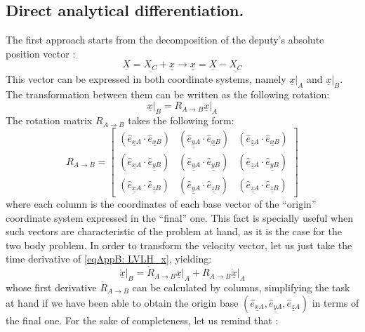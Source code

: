 	\subsection{Direct analytical differentiation.} \label{sec:	LVLH_theory}
	\indent The first approach starts from the decomposition of the deputy's absolute position vector \cite{LVLH}:
	\[
	\underline{X} = \underline{X_C} + \underline{x} \rightarrow \underline{x} = \underline{X} - \underline{X_C}
	\]
	\indent This vector can be expressed in both coordinate systems, namely $\underline{x}\rvert_A$ and $\underline{x}\rvert_B$. The transformation between them can be written as the following rotation:
	\begin{equation}
	\underline{x}\rvert_{B} = R_{A \to B} \underline{x}\rvert_{A}
	\label{eqAppB: 	LVLH_x}
	\end{equation}
	\indent The rotation matrix $R_{A \to B}$ takes the following form:
	\[
	R_{A \to B} = 
	\left[ \begin{array}{ccc}
	\left(\underline{\hat{e}_{xA}} \cdot \underline{\hat{e}_{xB}}\right) & \left(\underline{\hat{e}_{yA}} \cdot \underline{\hat{e}_{xB}}\right) & \left(\underline{\hat{e}_{zA}} \cdot \underline{\hat{e}_{xB}}\right) \\
	\left(\underline{\hat{e}_{xA}} \cdot \underline{\hat{e}_{yB}}\right) & \left(\underline{\hat{e}_{yA}} \cdot \underline{\hat{e}_{yB}}\right) & \left(\underline{\hat{e}_{zA}} \cdot \underline{\hat{e}_{yB}}\right) \\
	\left(\underline{\hat{e}_{xA}} \cdot \underline{\hat{e}_{zB}}\right) & \left(\underline{\hat{e}_{yA}} \cdot \underline{\hat{e}_{zB}}\right) & \left(\underline{\hat{e}_{zA}} \cdot \underline{\hat{e}_{zB}}\right)
	\end{array}\right]
	\]
	\noindent where each column is the coordinates of each base vector of the ``origin'' coordinate system expressed in the ``final'' one. This fact is specially useful when such vectors are characteristic of the problem at hand, as it is the case for the two body problem. In order to transform the velocity vector, let us just take the time derivative of \ref{eqAppB: 	LVLH_x}, yielding:
	\begin{equation}
	\underline{\dot{x}}\rvert_{B} = \dot{R}_{A \to B} \underline{x}\rvert_{A} + R_{A \to B} \underline{\dot{x}}\rvert_{A}
	\label{eqAppB: 	LVLH_xdot}
	\end{equation}
	\noindent whose first derivative $\dot{R}_{A \to B}$ can be calculated by columns, simplifying the task at hand if we have been able to obtain the origin base $\left( \underline{\hat{e}_{xA}}, \underline{\hat{e}_{yA}}, \underline{\hat{e}_{zA}}\right)$ in terms of the final one. For the sake of completeness, let us remind that \cite{LVLH}:
